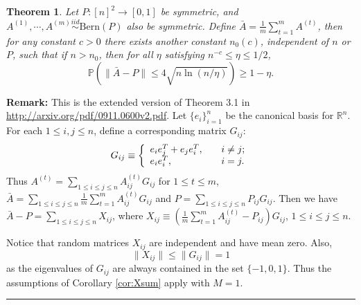 \documentclass[a4paper]{article}
\newenvironment{proof}{{\bf Proof:  }}{\hfill\rule{2mm}{2mm}}
\newtheorem{theorem}[fact]{Theorem}
\begin{document}
\begin{theorem}
\label{thm:AbarDiff}
Let $P:[n]^2 \rightarrow [0,1]$ be symmetric, and $A^{(1)}, \cdots, A^{(m)} \stackrel{iid}{\sim} \mathrm{Bern}(P)$ also be symmetric. Define $\bar{A} = \frac{1}{m} \sum_{t = 1}^m A^{(t)}$, then for any constant $c > 0$ there exists another constant $n_0(c)$, independent of $n$ or $P$, such that if $n > n_0$, then for all $\eta$ satisfying $n^{-c} \le \eta \le 1/2$,
\[
	\mathbb{P} \left( \| \bar{A} - P \| \le 4 \sqrt{n \ln(n/\eta)} \right) \ge 1 - \eta.
\]
\end{theorem}
\textbf{Remark:} This is the extended version of Theorem 3.1 in \href{url}{http://arxiv.org/pdf/0911.0600v2.pdf}.
\begin{proof}
Let $\{e_i\}_{i=1}^n$ be the canonical basis for $\mathbb{R}^n$. For each $1 \le i, j \le n$, define a corresponding matrix $G_{ij}$:
\[
    G_{ij} \equiv \left\{
    \begin{array}{l l}
        e_i e_j^T + e_j e_i^T, \quad & i \ne j;\\
        e_i e_i^T, \quad & i = j.
    \end{array}
    \right.
\]
Thus $A^{(t)} = \sum_{1 \le i \le j \le n} A^{(t)}_{ij} G_{ij}$ for $1 \le t \le m$, $\bar{A} = \sum_{1 \le i \le j \le n} \frac{1}{m} \sum_{t = 1}^m A^{(t)}_{ij} G_{ij}$ and $P = \sum_{1 \le i \le j \le n} P_{ij} G_{ij}$. Then we have $\bar{A} - P = \sum_{1 \le i \le j \le n} X_{ij}$, where $X_{ij} \equiv \left( \frac{1}{m} \sum_{t=1}^m A_{ij}^{(t)} - P_{ij} \right) G_{ij}$, $1 \le i \le j \le n$.

Notice that random matrices $X_{ij}$ are independent and have mean zero. Also,
\[
	\|X_{ij}\| \le \|G_{ij}\| = 1
\]
as the eigenvalues of $G_{ij}$ are always contained in the set $\{-1, 0, 1\}$. Thus the assumptions of Corollary \ref{cor:Xsum} apply with $M=1$.


\end{proof}
\end{document}
